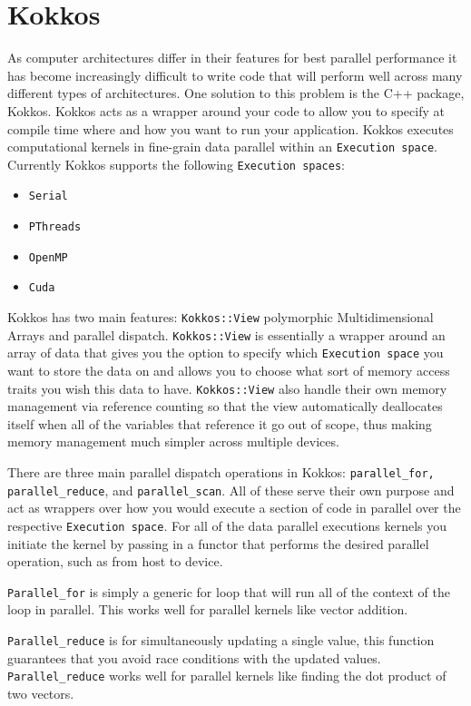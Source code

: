\documentclass{ccr15}
\begin{document}
\section{Kokkos}
As computer architectures differ in their features for best parallel performance it has
become increasingly difficult to write code that will perform well across many different types of
architectures. One solution to this problem is the C++ package, Kokkos. Kokkos acts as a wrapper
around your code to allow you to specify at compile time where and how you want to run your
application. Kokkos executes computational kernels in fine-grain data parallel within an 
\texttt{Execution space}.
Currently Kokkos supports the following \texttt{Execution spaces}:
\begin{itemize}
\item \texttt{Serial}
\item \texttt{PThreads}\cite{ZAB:PThreads}
\item \texttt{OpenMP}\cite{ZAB:OpenMP}
\item \texttt{Cuda}\cite{ZAB:CUDA}
\end{itemize}

Kokkos has two main features: \texttt{Kokkos::View} polymorphic Multidimensional  Arrays and parallel dispatch.
  \texttt{Kokkos::View} is essentially a wrapper around
an array of data that gives you the option to specify which \texttt{Execution space} you want to store the
data on and allows you to choose what sort of memory access traits you wish this data to have.
\texttt{Kokkos::View}  also handle their own memory management via reference counting so that the view
automatically deallocates itself when all of the variables that reference it go out of scope,
thus making memory management much simpler across multiple devices.

There are three main parallel dispatch operations in Kokkos: \texttt{parallel\_for,}  \texttt{parallel\_reduce}, and \texttt{parallel\_scan}. 
All of these serve their own purpose and act as wrappers over how you would execute a section of 
code in parallel over the respective \texttt{Execution space}. 
For all of the data parallel executions kernels you initiate the kernel by passing in a functor 
that performs the desired parallel operation, such as from host to device.

\texttt{Parallel\_for} is simply a generic for loop that will run all of the context of the loop in
parallel. This works well for parallel kernels like vector addition. 

\texttt{Parallel\_reduce} is for
simultaneously updating a single value, this function guarantees that you avoid race conditions
with the updated values. \texttt{Parallel\_reduce} works well for parallel kernels like finding the dot
product of two vectors. 
\end{document}
